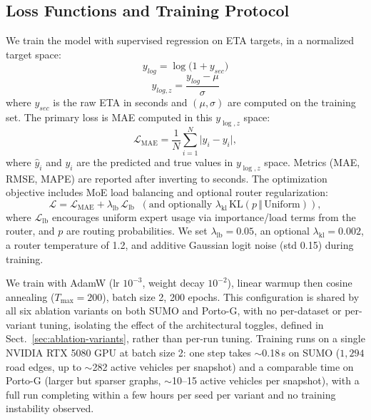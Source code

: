 \documentclass[pdflatex,sn-basic,Numbered]{sn-jnl}%
\begin{document}
\subsection{Loss Functions and Training Protocol}\label{sec:loss}
We train the model with supervised regression on ETA targets, in a normalized target space:
\begin{equation}
y_{log} = \log\big(1 + y_{sec}\big)
\end{equation}
\begin{equation}
y_{log,z} = \frac{y_{log} - \mu}{\sigma}
\end{equation}
where $y_{sec}$ is the raw ETA in seconds and $(\mu,\sigma)$ are computed on the training set. The primary loss is MAE computed in this $y_{\log,z}$ space:
\begin{equation}
\mathcal{L}_{\text{MAE}} = \frac{1}{N}\sum_{i=1}^N \big| \hat{y}_i - y_i \big|,
\end{equation}
where $\hat{y}_i$ and $y_i$ are the predicted and true values in $y_{\log,z}$ space. Metrics (MAE, RMSE, MAPE) are reported after inverting to seconds. The optimization objective includes MoE load balancing and optional router regularization:
\begin{equation}
\mathcal{L} = \mathcal{L}_{\text{MAE}} + \lambda_{\text{lb}}\,\mathcal{L}_{\text{lb}} \;\; (\text{and optionally }
\lambda_{\text{kl}}\,\mathrm{KL}(p\,\Vert\,\text{Uniform})),
\end{equation}
where $\mathcal{L}_{\text{lb}}$ encourages uniform expert usage via importance/load terms from the router, and $p$ are routing probabilities. We set $\lambda_{\text{lb}}{=}0.05$, an optional $\lambda_{\text{kl}}{=}0.002$, a router temperature of 1.2, and additive Gaussian logit noise (std 0.15) during training.

We train with AdamW (lr $10^{-3}$, weight decay $10^{-2}$), linear warmup then cosine annealing ($T_{\text{max}}{=}200$), batch size 2, 200 epochs. This configuration is shared by all six ablation variants on both SUMO and Porto-G, with no per-dataset or per-variant tuning, isolating the effect of the architectural toggles, defined in Sect.~\ref{sec:ablation-variants}, rather than per-run tuning. Training runs on a single NVIDIA RTX 5080 GPU at batch size 2: one step takes $\sim$0.18\,s on SUMO ($1{,}294$ road edges, up to $\sim$282 active vehicles per snapshot) and a comparable time on Porto-G (larger but sparser graphs, $\sim$10--15 active vehicles per snapshot), with a full run completing within a few hours per seed per variant and no training instability observed.
\end{document}
